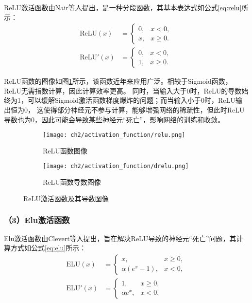 ReLU激活函数由Nair等人\cite{Nair_Hinton_2010}提出，是一种分段函数，其基本表达式如公式\eqref{eq:relu}所示：
\begin{equation}
  \begin{aligned}
  \text{ReLU}(x) &= \begin{cases}
    0, & x < 0, \\
    x, & x \geq 0.
    \end{cases} \\
  \text{ReLU}'(x) &= \begin{cases}
  0, & x < 0, \\
  1, & x \geq 0.
  \end{cases}
  \end{aligned}
  \label{eq:relu}
\end{equation}

ReLU函数的图像如图\ref{fig:relu}所示，该函数近年来应用广泛。相较于Sigmoid函数，ReLU无需指数计算，因此计算效率更高。
同时，当输入大于0时，ReLU的导数始终为1，可以缓解Sigmoid激活函数梯度爆炸的问题；而当输入小于0时，ReLU输出恒为0，
这使得部分神经元不参与计算，能够增强网络的稀疏性，但此时ReLU导数也为0，因此可能会导致某些神经元“死亡”，影响网络的训练和收敛。
\begin{figure}[H]
  \centering
  \begin{subfigure}[t]{0.45\textwidth}
    \centering
    \texttt{[image: ch2/activation\_function/relu.png]}
    \caption{ReLU函数图像}
  \end{subfigure}
  \begin{subfigure}[t]{0.45\textwidth}
    \centering
    \texttt{[image: ch2/activation\_function/drelu.png]}
    \caption{ReLU函数导数图像}
  \end{subfigure}
  \caption{ReLU激活函数及其导数图像}
  \label{fig:relu}
\end{figure}

\subsubsection*{（3）Elu激活函数}

Elu激活函数由Clevert等人\cite{ClevertUH15}提出，旨在解决ReLU导致的神经元“死亡”问题，其计算方式如公式\eqref{eq:elu}所示：
\begin{equation}
  \begin{aligned}
  \text{ELU}(x) &= \begin{cases}
  x, & x \geq 0, \\
  \alpha \left(e^x - 1\right), & x < 0,
  \end{cases} \\
  \text{ELU}'(x) &= \begin{cases}
  1, & x \geq 0, \\
  \alpha e^x, & x < 0.
  \end{cases}
  \end{aligned}
  \label{eq:elu}
\end{equation}

